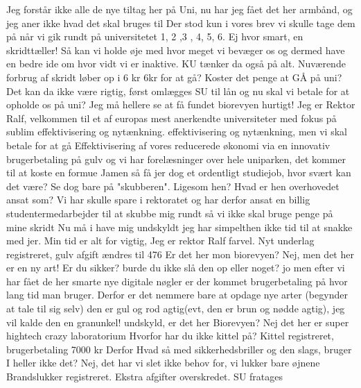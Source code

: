 \documentclass[a4paper,11pt]{article}
\begin{document}
\begin{sketch}

 Jeg forstår ikke alle de nye tiltag her på Uni, nu har jeg fået det her armbånd, og jeg aner ikke hvad det skal bruges til Der stod kun i vores brev vi skulle tage dem på når vi gik rundt på universitetet
 1, 2 ,3 , 4, 5, 6.
 Ej hvor smart, en skridttæller! Så kan vi holde øje med hvor meget vi bevæger os og dermed have en bedre ide om hvor vidt vi er inaktive. KU  tænker da også på alt.
 Nuværende forbrug af skridt løber op i 6 kr
 6kr for at gå? Koster det penge at GÅ på uni? Det kan da ikke være rigtig, først omlægges SU til lån og nu skal vi betale for at opholde os på uni? Jeg må hellere se at få fundet biorevyen hurtigt!
 Jeg er Rektor Ralf, velkommen til et af europas mest anerkendte universiteter med fokus på sublim effektivisering og nytænkning.
 effektivisering og nytænkning, men vi skal betale for at gå
 Effektivisering af vores reducerede økonomi via en innovativ brugerbetaling på gulv
 og vi har forelæsninger over hele uniparken, det kommer til at koste en formue
 Jamen så få jer dog et ordentligt studiejob, hvor svært kan det være? Se dog bare på "skubberen". 
 Ligesom hen? Hvad er hen overhovedet ansat som? 
 Vi har skulle spare i rektoratet og har derfor ansat en billig studentermedarbejder til at skubbe mig rundt så vi ikke skal bruge penge på mine skridt
 Nu må i have mig undskyldt jeg har simpelthen ikke tid til at snakke med jer. Min tid er alt for vigtig, Jeg er rektor Ralf farvel.
 Nyt underlag registreret, gulv afgift ændres til 476%
 Er det her mon biorevyen?
  Nej, men det her er en ny art! 
 Er du sikker? burde du ikke slå den op eller noget?
 jo men efter vi har fået de her smarte nye digitale nøgler er der kommet brugerbetaling på hvor lang tid man bruger. Derfor er det nemmere bare at opdage nye arter
(begynder at tale til sig selv) den er gul og rod agtig(evt, den er brun og nødde agtig), jeg vil kalde den en granunkel!
 
 undskyld, er det her Biorevyen? 
 Nej det her er super hightech crazy laboratorium
 Hvorfor har du ikke kittel på?
 Kittel registreret, brugerbetaling 7000 kr
  Derfor
 Hvad så med sikkerhedsbriller og den slags, bruger I heller ikke det? 
 Nej, det har vi slet ikke behov for, vi lukker bare øjnene 
 Brandslukker registreret. Ekstra afgifter overskredet. SU fratages


\end{sketch}
\end{document}
